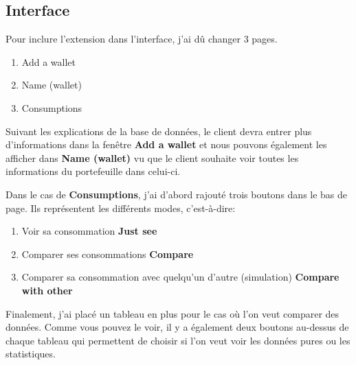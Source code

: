 \subsection{Interface}

\begin{flushleft}
Pour inclure l'extension dans l'interface, j'ai dû changer 3 pages.
\end{flushleft}

\begin{enumerate}[-]
\item Add a wallet
\item Name (wallet)
\item Consumptions
\end{enumerate}

\begin{flushleft}
Suivant les explications de la base de données, le client devra entrer plus d'informations dans la fenêtre \textbf{Add a wallet} et nous pouvons également les afficher dans \textbf{Name (wallet)} vu que le client souhaite voir toutes les informations du portefeuille dans celui-ci.
\end{flushleft}

\begin{flushleft}
Dans le cas de \textbf{Consumptions}, j'ai d'abord rajouté trois boutons dans le bas de page. Ils représentent les différents modes, c'est-à-dire:
\end{flushleft}

\begin{enumerate}[-]
\item Voir sa consommation \textbf{Just see}
\item Comparer ses consommations \textbf{Compare}
\item Comparer sa consommation avec quelqu'un d'autre (simulation) \textbf{Compare with other}
\end{enumerate}

\begin{flushleft}
Finalement, j'ai placé un tableau en plus pour le cas où l'on veut comparer des données. Comme vous pouvez le voir, il y a également deux boutons au-dessus de chaque tableau qui permettent de choisir si l'on veut voir les données pures ou les statistiques.
\end{flushleft}

